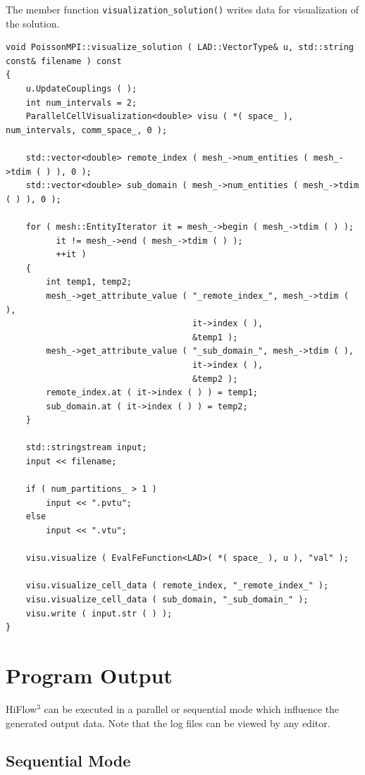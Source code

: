 \documentclass{article}
\begin{document}
The member function \texttt{visualization\_solution()} writes data for visualization of the solution. 

\begin{lstlisting}
void PoissonMPI::visualize_solution ( LAD::VectorType& u, std::string const& filename ) const
{
    u.UpdateCouplings ( );
    int num_intervals = 2;
    ParallelCellVisualization<double> visu ( *( space_ ), num_intervals, comm_space_, 0 );

    std::vector<double> remote_index ( mesh_->num_entities ( mesh_->tdim ( ) ), 0 );
    std::vector<double> sub_domain ( mesh_->num_entities ( mesh_->tdim ( ) ), 0 );

    for ( mesh::EntityIterator it = mesh_->begin ( mesh_->tdim ( ) );
          it != mesh_->end ( mesh_->tdim ( ) );
          ++it )
    {
        int temp1, temp2;
        mesh_->get_attribute_value ( "_remote_index_", mesh_->tdim ( ),
                                     it->index ( ),
                                     &temp1 );
        mesh_->get_attribute_value ( "_sub_domain_", mesh_->tdim ( ),
                                     it->index ( ),
                                     &temp2 );
        remote_index.at ( it->index ( ) ) = temp1;
        sub_domain.at ( it->index ( ) ) = temp2;
    }

    std::stringstream input;
    input << filename;

    if ( num_partitions_ > 1 )
        input << ".pvtu";
    else
        input << ".vtu";

    visu.visualize ( EvalFeFunction<LAD>( *( space_ ), u ), "val" );

    visu.visualize_cell_data ( remote_index, "_remote_index_" );
    visu.visualize_cell_data ( sub_domain, "_sub_domain_" );
    visu.write ( input.str ( ) );
}
\end{lstlisting}


\pagebreak

\section{Program Output}
\label{sec:output}
HiFlow$^3$ can be executed in a parallel or sequential mode which influence the generated output data. Note that the log files can be viewed by any editor.

\subsection{Sequential Mode}
\end{document}
